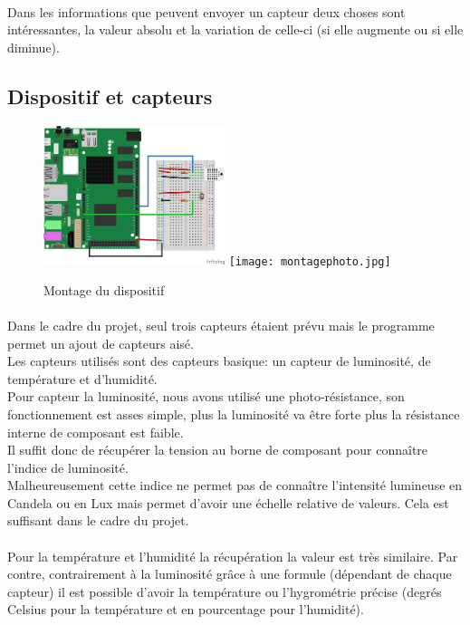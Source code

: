 \documentclass[a4paper, titlepage, oneside, 12pt]{article}%
\begin{document}
\paragraph{}
Dans les informations que peuvent envoyer un capteur deux choses sont intéressantes, la valeur absolu et la variation de celle-ci (si elle augmente ou si elle diminue).
\subsection{Dispositif et capteurs}
\begin{figure}
	\centering
	\includegraphics[width=200px]{montage.jpg}
		\texttt{[image: montagephoto.jpg]}
	\caption{Montage du dispositif}
\end{figure}
\paragraph{}
Dans le cadre du projet, seul trois capteurs étaient prévu mais le programme permet un ajout de capteurs aisé.\\
Les capteurs utilisés sont des capteurs basique: un capteur de luminosité, de température et d'humidité.\\

Pour capteur la luminosité, nous avons utilisé une photo-résistance, son fonctionnement est asses simple, plus la luminosité va être forte plus la résistance interne de composant est faible. \\
Il suffit donc de récupérer la tension au borne de composant pour connaître l'indice de luminosité.\\ 
Malheureusement cette indice ne permet pas de connaître l'intensité lumineuse en Candela ou en Lux mais permet d'avoir une échelle relative de valeurs. Cela est suffisant dans le cadre du projet.
\paragraph{}
Pour la température et l'humidité la récupération la valeur est très similaire. Par contre, contrairement à la luminosité grâce à une formule (dépendant de chaque capteur) il est possible d'avoir la température ou l'hygrométrie précise (degrés Celsius pour la température et en pourcentage pour l'humidité). 
\end{document}
